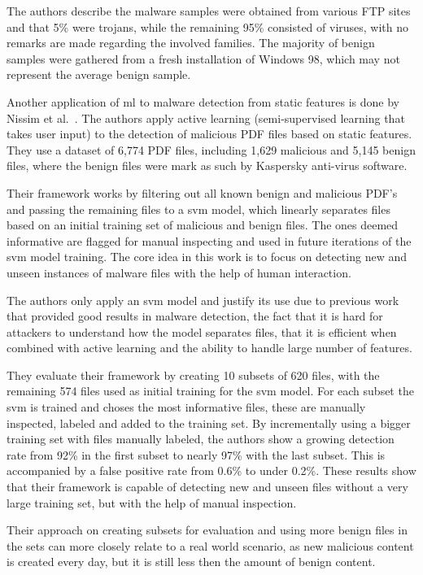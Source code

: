 The authors describe the malware samples were obtained from various FTP sites and that 5\% were trojans, while the remaining 95\% consisted of viruses, with no remarks are made regarding the involved families.
The majority of benign samples were gathered from a fresh installation of Windows 98, which may not represent the average benign sample.

\medskip

Another application of \gls{ml} to malware detection from static features is done by Nissim et al.~\cite{nissim:al_pdf}.
The authors apply active learning (semi-supervised learning that takes user input) to the detection of malicious PDF files based on static features.
They use a dataset of 6,774 PDF files, including 1,629 malicious and 5,145 benign files, where the benign files were mark as such by Kaspersky anti-virus software.

Their framework works by filtering out all known benign and malicious PDF's and passing the remaining files to a \gls{svm} model, which linearly separates files based on an initial training set of malicious and benign files.
The ones deemed informative are flagged for manual inspecting and used in future iterations of the \gls{svm} model training.
The core idea in this work is to focus on detecting new and unseen instances of malware files with the help of human interaction.

The authors only apply an \gls{svm} model and justify its use due to previous work that provided good results in malware detection, the fact that it is hard for attackers to understand how the model separates files, that it is efficient when combined with active learning and the ability to handle large number of features.

They evaluate their framework by creating 10 subsets of 620 files, with the remaining 574 files used as initial training for the \gls{svm} model.
For each subset the \gls{svm} is trained and choses the most informative files, these are manually inspected, labeled and added to the training set.
By incrementally using a bigger training set with files manually labeled, the authors show a growing detection rate from 92\% in the first subset to nearly 97\% with the last subset.
This is accompanied by a false positive rate from 0.6\% to under 0.2\%.
These results show that their framework is capable of detecting new and unseen files without a very large training set, but with the help of manual inspection.

Their approach on creating subsets for evaluation and using more benign files in the sets can more closely relate to a real world scenario, as new malicious content is created every day, but it is still less then the amount of benign content.

